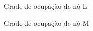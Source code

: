 \documentclass{llncs}
\begin{document}
\begin{figure}
	\centering
	\caption{Grade de ocupação do nó L}
	\label{fig:grade_no_L}
\end{figure}
\begin{figure}
	\centering
	\caption{Grade de ocupação do nó M}
	\label{fig:grade_no_M}
\end{figure}
\end{document}
